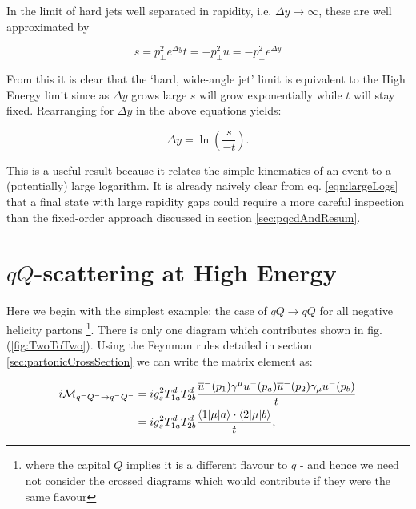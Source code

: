 		In the limit of hard jets well separated in rapidity, i.e. $\Delta y\rightarrow\infty$,
		these are well approximated by

		\begin{subequations}
			\begin{equation}
				s = p_\perp^2 e^{\Delta y}
			\end{equation}
			\begin{equation}
				t = -p_\perp^2
			\end{equation}
			\begin{equation}
				u = -p_\perp^2 e^{\Delta y}
			\end{equation}
		\end{subequations}

		From this it is clear that the `hard, wide-angle jet' limit is equivalent to the High Energy
		limit since as $\Delta y$ grows large $s$ will grow exponentially while $t$ will stay fixed.
		Rearranging for $\Delta y$ in the above equations yields:

		\begin{equation}
			\Delta y = \ln \left(\frac{s}{-t}\right).
			\label{eqn:largeLogs}
		\end{equation}

		This is a useful result because it relates the simple kinematics of an event to a (potentially)
		large logarithm.  It is already naively clear from eq. \eqref{eqn:largeLogs} that a final state
		with large rapidity gaps could require a more careful inspection than the fixed-order approach
		discussed in section \ref{sec:pqcdAndResum}.

	\section{$qQ$-scattering at High Energy}

		Here we begin with the simplest example; the case of $qQ\rightarrow qQ$ for all negative helicity partons
		\footnote{where the capital $Q$ implies it is a different flavour to $q$ - and hence we need not consider the crossed
		diagrams which would contribute if they were the same flavour}. There is only one diagram which contributes shown
		in fig. (\ref{fig:TwoToTwo}).  Using the Feynman rules detailed in section \ref{sec:partonicCrossSection} we can
		write the matrix element as:

		\begin{align}
			i\mathcal{M}_{q^-Q^-\rightarrow q^-Q^-} &= ig_s^2T^d_{1a}T^d_{2b}\frac{\overline{u}^-(p_1)\gamma^\mu
			  u^-(p_a)\overline{u}^-(p_2)\gamma_\mu u^-(p_b)}{t}\\
			  &= ig_s^2T^d_{1a}T^d_{2b}\frac{\langle 1 | \mu | a \rangle\cdot\langle 2 | \mu | b \rangle}{t},
		\end{align}

